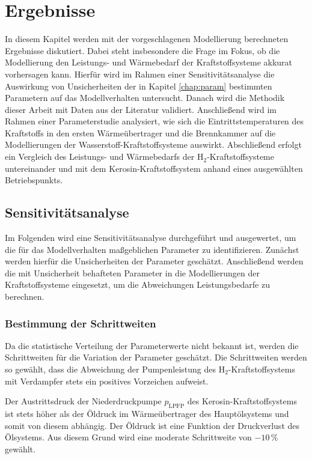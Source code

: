 \chapter{Ergebnisse} \label{chap:ergebnis}

In diesem Kapitel werden mit der vorgeschlagenen Modellierung berechneten Ergebnisse diskutiert. Dabei steht insbesondere die Frage im Fokus, ob die Modellierung den Leistungs- und Wärmebedarf der Kraftstoffsysteme akkurat vorhersagen kann. Hierfür wird im Rahmen einer Sensitivitätsanalyse die Auswirkung von Unsicherheiten der in Kapitel \ref{chap:param} bestimmten Parametern auf das Modellverhalten untersucht. Danach wird die Methodik dieser Arbeit mit Daten aus der Literatur validiert. Anschließend wird im Rahmen einer Parameterstudie analysiert, wie sich die Eintrittstemperaturen des Kraftstoffs in den ersten Wärmeübertrager und die Brennkammer auf die Modellierungen der Wasserstoff-Kraftstoffsysteme auswirkt. Abschließend erfolgt ein Vergleich des Leistungs- und Wärmebedarfs der H$_2$-Kraftstoffsysteme untereinander und mit dem Kerosin-Kraftstoffsystem anhand eines ausgewählten Betriebspunkts.

\section{Sensitivitätsanalyse}

Im Folgenden wird eine Sensitivitätsanalyse durchgeführt und ausgewertet, um die für das Modellverhalten maßgeblichen Parameter zu identifizieren. Zunächst werden hierfür die Unsicherheiten der Parameter geschätzt. Anschließend werden die mit Unsicherheit behafteten Parameter in die Modellierungen der Kraftstoffsysteme eingesetzt, um die Abweichungen Leistungsbedarfe zu berechnen.

\subsection{Bestimmung der Schrittweiten}

Da die statistische Verteilung der Parameterwerte nicht bekannt ist, werden die Schrittweiten für die Variation der Parameter geschätzt. Die Schrittweiten werden so gewählt, dass die Abweichung der Pumpenleistung des H$_2$-Kraftstoffsystems mit Verdampfer stets ein positives Vorzeichen aufweist.

Der Austrittsdruck der Niederdruckpumpe $p_\mathrm{LPFP}$ des Kerosin-Kraftstoffsystems ist stets höher als der Öldruck im Wärmeübertrager des Hauptölsystems und somit von diesem abhängig. Der Öldruck ist eine Funktion der Druckverlust des Ölsystems. Aus diesem Grund wird eine moderate Schrittweite von $-10\,\%$ gewählt.

